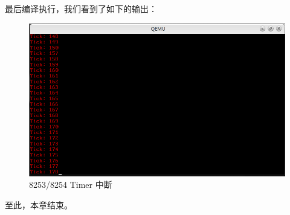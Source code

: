 \par 最后编译执行，我们看到了如下的输出：
\begin{figure}[H]
      \centering
      \includegraphics[scale=0.5]{picture/chapt8/8253_TIMER.png}
      \caption{8253/8254 Timer 中断}
\end{figure}

\par 至此，本章结束。

